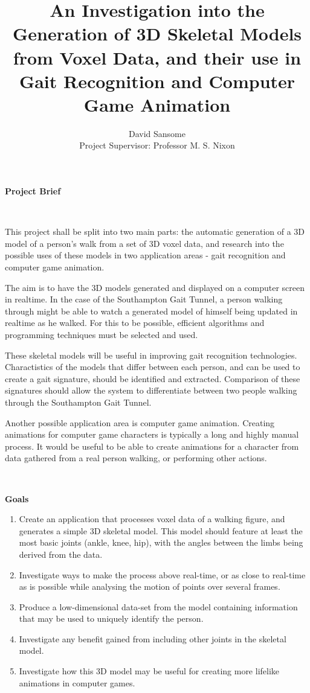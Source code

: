 \documentclass[a4paper,10pt]{article}
\title{An Investigation into the Generation of 3D Skeletal Models from Voxel Data, and their use in Gait Recognition and Computer Game Animation}
\author{David Sansome \\
Project Supervisor: Professor M. S. Nixon}
\begin{document}
\maketitle

\noindent\textbf{Project Brief}

\

This project shall be split into two main parts: the automatic generation of a 3D model of a person's walk from a set of 3D voxel data,
and research into the possible uses of these models in two application areas - gait recognition and computer game animation.

The aim is to have the 3D models generated and displayed on a computer screen in realtime.
In the case of the Southampton Gait Tunnel, a person walking through might be able to watch a generated
model of himself being updated in realtime as he walked.
For this to be possible, efficient algorithms and programming techniques must be selected and used.

These skeletal models will be useful in improving gait recognition technologies.
Charactistics of the models that differ between each person, and can be used to create a gait signature,
should be identified and extracted.
Comparison of these signatures should allow the system to differentiate between two people walking through
the Southampton Gait Tunnel.

Another possible application area is computer game animation.
Creating animations for computer game characters is typically a long and highly manual process.
It would be useful to be able to create animations for a character from data gathered from a real person walking,
or performing other actions.

\

\noindent\textbf{Goals}

\begin{enumerate}
	\item Create an application that processes voxel data of a walking figure,
		and generates a simple 3D skeletal model.
		This model should feature at least the most basic joints (ankle, knee, hip),
		with the angles between the limbs being derived from the data.
	\item Investigate ways to make the process above real-time,
		or as close to real-time as is possible while analysing the motion of points over several frames.
	\item Produce a low-dimensional data-set from the model containing information that may be used to uniquely
		identify the person.
	\item Investigate any benefit gained from including other joints in the skeletal model.
	\item Investigate how this 3D model may be useful for creating more lifelike animations in computer games.
\end{enumerate}
\end{document}
